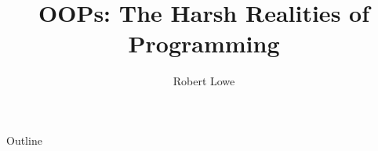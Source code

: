 \documentclass[handout]{beamer}
\title{OOPs: The Harsh Realities of Programming}
\author{Robert Lowe\\}
\institute[Maryville College] %
{
  Division of Mathematics and Computer Science\\
  Maryville College
}
\date[]{}
\begin{document}
\begin{frame}
  \titlepage
\end{frame}

\begin{frame}{Outline}
  \tableofcontents
\end{frame}




\end{document}

